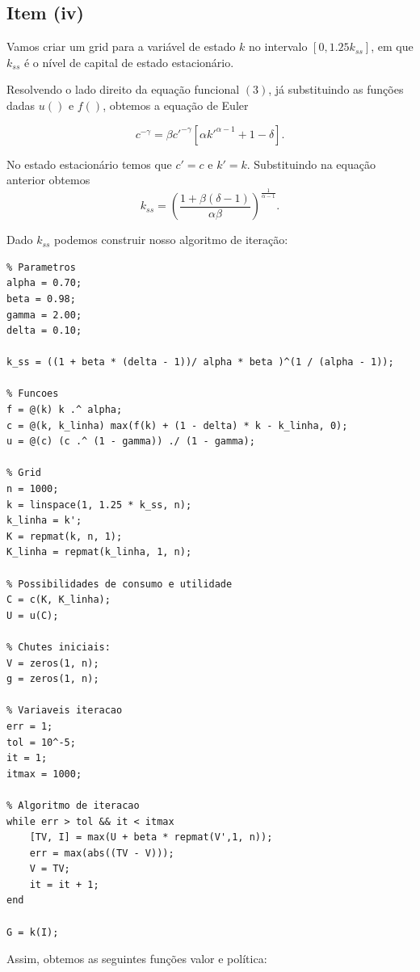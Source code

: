 \documentclass{article}
\begin{document}
\subsection*{Item (iv)}

Vamos criar um grid para a variável de estado $k$ no intervalo $[0, 1.25 k_{ss}]$, em que $k_{ss}$ é o nível
de capital de estado estacionário. 

Resolvendo o lado direito da equação funcional $(3)$, já substituindo as funções dadas $u()$ e $f()$, 
obtemos a equação de Euler

$$ c^{-\gamma} = \beta c'^{-\gamma} [\alpha k'^{\alpha-1} + 1 - \delta].$$

No estado estacionário temos que $c' = c$ e $k' = k$. Substituindo na equação anterior obtemos
\begin{equation}
k_{ss} = \left( \frac{1 + \beta (\delta - 1)}{\alpha \beta} \right)^{\frac{1}{\alpha - 1}}.
\end{equation}

Dado $k_{ss}$ podemos construir nosso algoritmo de iteração:

\begin{lstlisting}
% Parametros
alpha = 0.70;
beta = 0.98;
gamma = 2.00;
delta = 0.10;

k_ss = ((1 + beta * (delta - 1))/ alpha * beta )^(1 / (alpha - 1));

% Funcoes
f = @(k) k .^ alpha;
c = @(k, k_linha) max(f(k) + (1 - delta) * k - k_linha, 0);
u = @(c) (c .^ (1 - gamma)) ./ (1 - gamma);

% Grid
n = 1000;
k = linspace(1, 1.25 * k_ss, n);
k_linha = k';
K = repmat(k, n, 1);
K_linha = repmat(k_linha, 1, n);

% Possibilidades de consumo e utilidade
C = c(K, K_linha);
U = u(C);

% Chutes iniciais:
V = zeros(1, n);
g = zeros(1, n);

% Variaveis iteracao
err = 1;
tol = 10^-5;
it = 1;
itmax = 1000;

% Algoritmo de iteracao
while err > tol && it < itmax
    [TV, I] = max(U + beta * repmat(V',1, n));
    err = max(abs((TV - V)));
    V = TV;
    it = it + 1;
end

G = k(I);
\end{lstlisting}

Assim, obtemos as seguintes funções valor e política:
\end{document}
